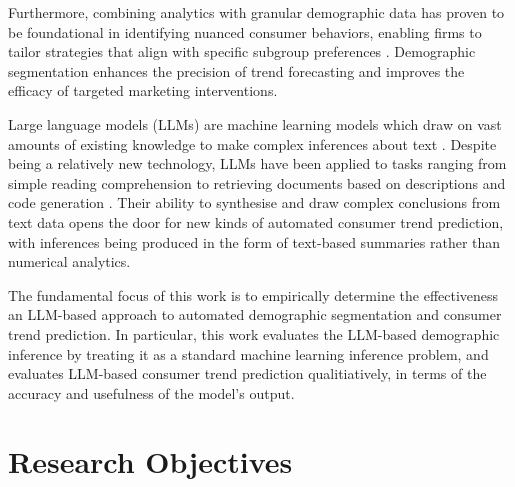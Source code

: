 \documentclass{report}
\begin{document}
Furthermore, combining analytics with granular demographic data has proven to be foundational in identifying nuanced consumer behaviors, enabling firms to tailor strategies that align with specific subgroup preferences \cite{wedel2000market}. Demographic segmentation enhances the precision of trend forecasting and improves the efficacy of targeted marketing interventions.

Large language models (LLMs) are machine learning models which draw on vast amounts of existing knowledge to make complex inferences about text \cite{NEURIPS2020_1457c0d6}. Despite being a relatively new technology, LLMs have been applied to tasks ranging from simple reading comprehension to retrieving documents based on descriptions \cite{lewis2020retrieval} and code generation \cite{chen2021evaluating}. Their ability to synthesise and draw complex conclusions from text data opens the door for new kinds of automated consumer trend prediction, with inferences being produced in the form of text-based summaries rather than numerical analytics.

The fundamental focus of this work is to empirically determine the effectiveness an LLM-based approach to automated demographic segmentation and consumer trend prediction. In particular, this work evaluates the LLM-based demographic inference by treating it as a standard machine learning inference problem, and evaluates LLM-based consumer trend prediction qualitiatively, in terms of the accuracy and usefulness of the model's output.


\section{Research Objectives}
\end{document}
